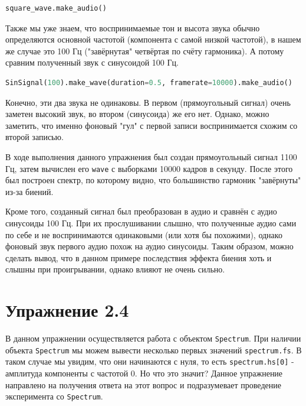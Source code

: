 \documentclass[a4paper, 14pt]{extarticle}
\begin{document}
    \begin{lstlisting}[language=Python, caption= Преобразование в аудио., label={lst:task3_audio_square}]
square_wave.make_audio()
    \end{lstlisting}

    Также мы уже знаем, что воспринимаемые тон и высота звука обычно определяются основной частотой (компонента с самой низкой частотой),
    в нашем же случае это 100 Гц ("завёрнутая" четвёртая по счёту гармоника).
    А потому сравним полученный звук с синусоидой 100 Гц.

    \begin{lstlisting}[language=Python, caption= Получение аудио синусоиды 100 Гц., label={lst:task3_audio_sin}]
SinSignal(100).make_wave(duration=0.5, framerate=10000).make_audio()
    \end{lstlisting}

    Конечно, эти два звука не одинаковы. В первом (прямоугольный сигнал) очень заметен высокий звук, во втором (синусоида) же его нет.
    Однако, можно заметить, что именно фоновый "гул" с первой записи воспринимается схожим со второй записью.

    В ходе выполнения данного упражнения был создан прямоугольный сигнал 1100 Гц, затем вычислен его \texttt{wave} с выборками 10000 кадров в секунду.
    После этого был построен спектр, по которому видно, что большинство гармоник "завёрнуты" из-за биений.

    Кроме того, созданный сигнал был преобразован в аудио и сравнён с аудио синусоиды 100 Гц. При их прослушивании слышно,
    что полученные аудио сами по себе и не воспринимаются одинаковыми (или хотя бы похожими), однако фоновый звук первого аудио
    похож на аудио синусоиды. Таким образом, можно сделать вывод, что в данном примере последствия эффекта биения хоть и слышны
    при проигрывании, однако влияют не очень сильно.

    \newpage

    \section{Упражнение 2.4}
    \label{sec:task4}

    В данном упражнении осуществляется работа с объектом \texttt{Spectrum}.
    При наличии объекта \texttt{Spectrum} мы можем вывести несколько первых значений \texttt{spectrum.fs}.
    В таком случае мы увидим, что они начинаются с нуля, то есть \texttt{spectrum.hs[0]} - амплитуда компоненты с частотой 0.
    Но что это значит? Данное упражнение направлено на получения ответа на этот вопрос и подразумевает проведение эксперимента
    со \texttt{Spectrum}.
\end{document}
